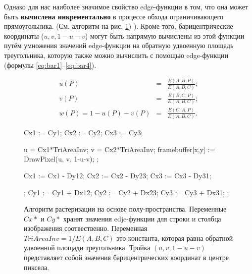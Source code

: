 \documentclass[12pt,subf,href,colorlinks=true]{article}
\begin{document}
Однако для нас наиболее значимое свойство edge-функции в том, что она может быть \textbf{вычислена инкрементально} в процессе обхода ограничивающего прямоугольника. (См. алгоритм на рис. \ref{alg:halfspace}) \cite{Pineda}). Кроме того, барицентрические координаты ($u,v,1-u-v$) могут быть напрямую вычислены из этой функции путём умножения значений edge-функции на обратную удвоенную площадь треугольника, которую также можно вычислить с помощью edge-функции (формулы \ref{eq:bar1}--\ref{eq:bar4}).

\begin{eqnarray}\label{eq:bar1}
	u(P)        &=& \frac{E(A,B,P)}{E(A,B,C)} ;\\ \label{eq:bar2}
	v(P)        &=& \frac{E(B,C,P)}{E(A,B,C)} ;\\ \label{eq:bar3}
	w(P) = 1-u(P)-v(P) &=& \frac{E(C,A,P)}{E(A,B,C)}. \label{eq:bar4}
\end{eqnarray}

\begin{figure}[h]
	\begin{algorithmic}[1]
		
		\State Cx1 := Cy1; 
		\State Cx2 := Cy2; 
		\State Cx3 := Cy3; 
		
		
		\State u = Cx1*TriAreaInv;
		\State v = Cx2*TriAreaInv;
		\State framebuffer[x,y] := DrawPixel(u, v, 1-u-v);
		\EndIf;
		
		\State Cx1 := Cx1 - Dy12;
		\State Cx2 := Cx2 - Dy23;
		\State Cx3 := Cx3 - Dy31;
		
		\EndFor;
		\State Cy1 := Cy1 + Dx12;
		\State Cy2 := Cy2 + Dx23;
		\State Cy3 := Cy3 + Dx31; 	
		\EndFor;
		
	\end{algorithmic}
	\caption{Алгоритм растеризации на основе полу-пространства. Переменные $Cx*$ и $Cy*$ хранят значения edje-функции для строки и столбца изображения соотвественно. Переменная  $TriAreaInv=1/E(A,B,C)$ это константа, которая равна обратной удвоенной площади треугольника. Тройка $(u,v, 1-u-v)$ представляет собой значения барицентрических координат в центре пиксела. }\label{alg:halfspace}
\end{figure}
\FloatBarrier
\end{document}
